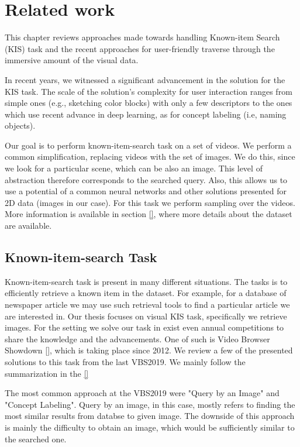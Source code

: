 \chapter{Related work}
\label{ch:related_work}


This chapter reviews approaches made towards handling Known-item Search (KIS) task and the recent approaches for user-friendly traverse through the immersive amount of the visual data.

In recent years, we witnessed a significant advancement in the solution for the KIS task. The scale of the solution's complexity for user interaction ranges from simple ones (e.g., sketching color blocks) with only a few descriptors to the ones which use recent advance in deep learning, as for concept labeling (i.e, naming objects).

Our goal is to perform known-item-search task on a set of videos. We perform a common simplification, replacing videos with the set of images. We do this, since we look for a particular scene, which can be also an image. This level of abstraction therefore corresponds to the searched query. Also, this allows us to use a potential of a common neural networks and other solutions presented for 2D data (images in our case). For this task we perform sampling over the videos. More information is available in section \ref{}, where more details about the dataset are available.

\section*{Known-item-search Task}

Known-item-search task is present in many different situations. The tasks is to efficiently retrieve a known item in the dataset. For example, for a database of newspaper article we may use such retrieval tools to find a particular article we are interested in. Our thesis focuses on visual KIS task, specifically we retrieve images. For the setting we solve our task in exist even annual competitions to share the knowledge and the advancements. One of such is Video Browser Showdown \ref{}, which is taking place since 2012. We review a few of the presented solutions to this task from the last VBS2019. We mainly follow the summarization in the \ref{}

The most common approach at the VBS2019 were "Query by an Image" and "Concept Labeling". Query by an image, in this case, mostly refers to finding the most similar results from databse to given image. The downside of this approach is mainly the difficulty to obtain an image, which would be sufficiently similar to the searched one.

